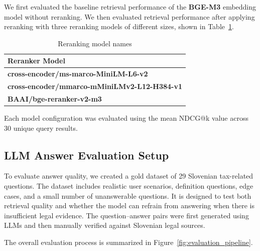 \documentclass[fleqn,moreauthors,10pt]{ds_report}
\begin{document}
We first evaluated the baseline retrieval performance of the \textbf{BGE-M3} embedding model without reranking. We then evaluated retrieval performance after applying reranking with three reranking models of different sizes, shown in Table~\ref{tab:reranker_models}.

\begin{table}[h]
\centering
\caption{Reranking model names}
\label{tab:reranker_models}
\renewcommand{\arraystretch}{1.2}
\small
\begin{tabular}{|l|}
\hline
\textbf{Reranker Model} \\
\hline
\textbf{cross-encoder/ms-marco-MiniLM-L6-v2} \\
\hline
\textbf{cross-encoder/mmarco-mMiniLMv2-L12-H384-v1} \\
\hline
\textbf{BAAI/bge-reranker-v2-m3} \\
\hline
\end{tabular}
\end{table}

Each model configuration was evaluated using the mean NDCG@k value across 30 unique query results.





\subsection*{LLM Answer Evaluation Setup}

To evaluate answer quality, we created a gold dataset of 29 Slovenian tax-related questions. The dataset includes realistic user scenarios, definition questions, edge cases, and a small number of unanswerable questions. It is designed to test both retrieval quality and whether the model can refrain from answering when there is insufficient legal evidence. The question--answer pairs were first generated using LLMs and then manually verified against Slovenian legal sources.

The overall evaluation process is summarized in Figure~\ref{fig:evaluation_pipeline}.
\end{document}
